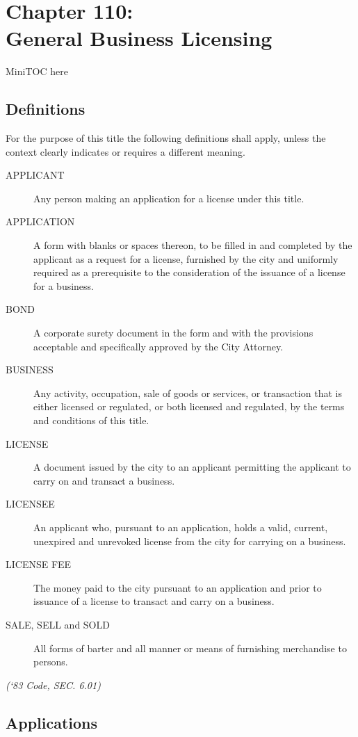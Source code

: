 \documentclass[code.tex]{subfiles}
\begin{document}
\chapter*{Chapter 110: \\
	General Business Licensing}

MiniTOC here
\pagebreak

\section{Definitions}
For the purpose of this title the following definitions shall apply, unless the context clearly indicates or requires a different meaning.
\begin{description}
    \item[APPLICANT]  Any person making an application for a license under this title.
    \item[APPLICATION]  A form with blanks or spaces thereon, to be filled in and completed by the applicant as a request for a license, furnished by the city and uniformly required as a prerequisite to the consideration of the issuance of a license for a business.
    \item[BOND]  A corporate surety document in the form and with the provisions acceptable and specifically approved by the City Attorney.
    \item[BUSINESS]  Any activity, occupation, sale of goods or services, or transaction that is either licensed or regulated, or both licensed and regulated, by the terms and conditions of this title.
    \item[LICENSE]  A document issued by the city to an applicant permitting the applicant to carry on and transact a business.
    \item[LICENSEE]  An applicant who, pursuant to an application, holds a valid, current, unexpired and unrevoked license from the city for carrying on a business.
    \item[LICENSE FEE]  The money paid to the city pursuant to an application and prior to issuance of a license to transact and carry on a business.
    \item[SALE, SELL and SOLD]  All forms of barter and all manner or means of furnishing merchandise to persons.
\end{description}
\emph{(‘83 Code, SEC. 6.01)}

\section{Applications}
\end{document}

